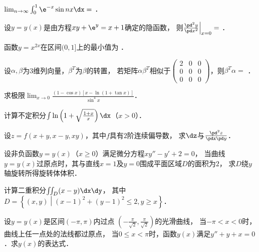 \documentclass[plain,noanswer,medmath]{../../template/jnuexam}
\begin{document}
\begin{problem}
$\lim_{n \to \infty} \int_{0}^{1} \e^{- x}\sin nx\dx =$ \fillin{}．
\end{problem}


\begin{problem}
设$y = y(x)$是由方程$xy + \e^y = x + 1$确定的隐函数，
则$\frac{\pd^2 y}{\pd x^2}\Big|_{x = 0} =$ \fillin{}．
\end{problem}


\begin{problem}
函数$y = x^{2x}$在区间$(0,1]$上的最小值为 \fillin{}．
\end{problem}


\begin{problem}
设$\alpha ,\beta$为3维列向量，$\beta^{T}$为$\beta$的转置，
若矩阵$\alpha \beta^{T}$相似于$\begin{pmatrix}
  2 & 0 & 0 \\
  0 & 0 & 0 \\
  0 & 0 & 0
\end{pmatrix}$，则$\beta^{T}\alpha =$ \fillin{}．
\end{problem}




\begin{problem}[points=9]
求极限$\lim_{x \to 0} \frac{\left(1 - \cos x \right)\left[x - \ln(1 + \tan x) \right]}{\sin^4 x}$．
\end{problem}


\begin{problem}[points=10]
计算不定积分$\int \ln \left(1 + \sqrt{\frac{1 + x}{x}} \right)\dx$（$x > 0$）．
\end{problem}


\begin{problem}[points=10]
设$z=f(x+y,x-y,xy)$，其中$f$具有$2$阶连续偏导数，
求$\dz$与$\frac{\pd^2 z}{\pdx\pd y}$．
\end{problem}


\begin{problem}[points=10]
设非负函数$y = y(x)$（$x \ge 0$）满足微分方程$xy'' - y' + 2 = 0$，
当曲线$y = y(x)$过原点时，其与直线$x = 1$及$y = 0$围成平面区域$D$的面积为$2$，
求$D$绕$y$轴旋转所得旋转体体积．
\end{problem}


\begin{problem}[points=10]
计算二重积分$\iint_D (x - y)\dx\dy$，
其中$D = \left\{(x,y) \middle| (x - 1)^2 + (y - 1)^2 \le 2,y \ge x \right\}$．
\end{problem}


\begin{problem}[points=12]
设$y = y(x)$是区间$(- \pi ,\pi)$内过点
$\left(- \frac{\pi}{\sqrt{2}},\frac{\pi}{\sqrt{2}} \right)$的光滑曲线，
当$- \pi < x < 0$时，曲线上任一点处的法线都过原点，
当$0 \le x < \pi$时，函数$y(x)$满足$y'' + y + x = 0$．求$y(x)$的表达式．
\end{problem}






\end{document}

